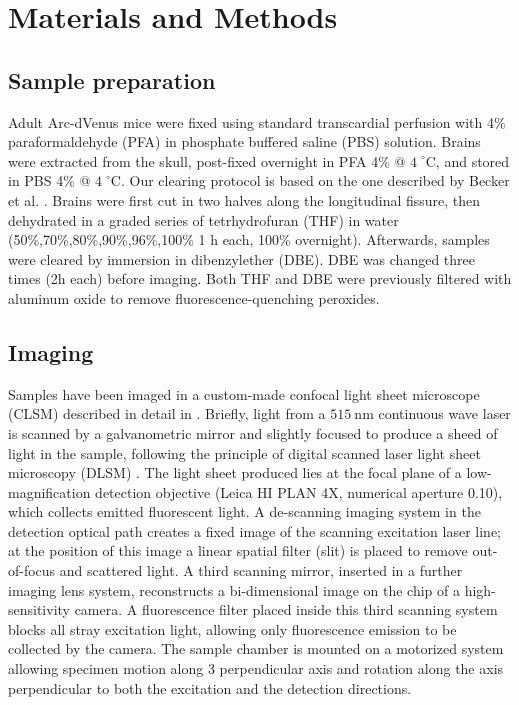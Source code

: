 \documentclass[smallextended]{svjour3}       %
\begin{document}
\section{Materials and Methods}

\subsection{Sample preparation}
\label{sec:sample}
Adult Arc-dVenus mice \cite{eguchi_vivo_2009} were fixed using standard transcardial perfusion with 4\%
paraformaldehyde (PFA) in phosphate buffered saline (PBS) solution. Brains were extracted from the skull,
post-fixed overnight in PFA 4\% @ ${4\;}^\circ$C, and stored in PBS 4\% @ ${4\;}^\circ$C. Our clearing protocol
is based on the one described by Becker et al. \cite{becker_chemical_2012}. Brains were first cut in two
halves along the longitudinal fissure, then dehydrated in a graded series of tetrhydrofuran (THF) in water
(50\%,70\%,80\%,90\%,96\%,100\% 1 h each, 100\% overnight). Afterwards, samples were cleared by immersion in
dibenzylether (DBE). DBE was changed three times (2h each) before imaging. Both THF and DBE were previously
filtered with aluminum oxide to remove fluorescence-quenching peroxides.

\subsection{Imaging}
\label{sec:imaging}
Samples have been imaged in a custom-made confocal light sheet microscope (CLSM) described in detail in
\cite{silvestri_confocal_2012}. Briefly, light from a $\SI{515}{\nano\meter}$ continuous wave laser is scanned by a galvanometric
mirror and slightly focused to produce a sheed of light in the sample, following the principle of digital
scanned laser light sheet microscopy (DLSM) \cite{keller_reconstruction_2008}. The light sheet produced lies at
the focal plane of a low-magnification detection objective (Leica HI PLAN 4X, numerical aperture 0.10), which
collects emitted fluorescent light. A de-scanning imaging system in the detection optical path creates a fixed
image of the scanning excitation laser line; at the position of this image a linear spatial filter (slit) is
placed to remove out-of-focus and scattered light. A third scanning mirror, inserted in a further imaging lens
system, reconstructs a bi-dimensional image on the chip of a high-sensitivity camera. A fluorescence filter
placed inside this third scanning system blocks all stray excitation light, allowing only fluorescence emission
to be collected by the camera. The sample chamber is mounted on a motorized system allowing specimen motion
along 3 perpendicular axis and rotation along the axis perpendicular to both the excitation and the detection directions.
\end{document}
